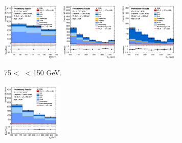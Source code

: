 \begin{figure}[h!]
    \centering
    \begin{subfigure}[b]{\textwidth}
        \centering
        \includegraphics[width=0.32\textwidth]{Images/VH/Own_fit/postfit_VHcc/Region_distpTV_BMax150_BMin75_DCRHigh_J3_TTypent_incJet1_T1_L2_Y6051_GlobalFit_conditionnal_mu1.png}
        \includegraphics[width=0.32\textwidth]{Images/VH/Own_fit/postfit_VHcc/Region_distmBB_BMax150_BMin75_DCRHigh_J3_TTypelt_incJet1_T2_L2_Y6051_GlobalFit_conditionnal_mu1.png}
        \includegraphics[width=0.32\textwidth]{Images/VH/Own_fit/postfit_VHcc/Region_distmBB_BMax150_BMin75_DCRHigh_J3_TTypett_incJet1_T2_L2_Y6051_GlobalFit_conditionnal_mu1.png}
        \caption{75 < \ptv\ < 150 GeV.}
        \label{fig:plots_VHcc_2L_75_CRH_3J}
    \end{subfigure}
    \begin{subfigure}[b]{\textwidth}
        \centering
        \includegraphics[width=0.32\textwidth]{Images/VH/Own_fit/postfit_VHcc/Region_distpTV_BMax250_BMin150_DCRHigh_J3_TTypent_incJet1_T1_L2_Y6051_GlobalFit_conditionnal_mu1.png}

\end{subfigure}
\end{figure}

